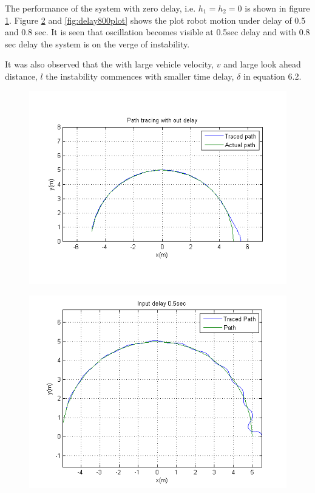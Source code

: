  The  performance of the system with zero delay, i.e. $h_1=h_2=0$ is shown in figure \ref{fig:nodelayplot}. Figure \ref{fig:delay500plot} and \ref{fig:delay800plot} shows the plot robot motion under delay of 0.5 and 0.8 sec.  It is seen that oscillation becomes visible at 0.5sec delay and with 0.8 sec delay the system is on the verge of instability. 
 
 It was also observed that the with large vehicle velocity, $v$ and large look ahead distance, $l$ the instability commences with smaller time delay, $\delta$ in equation 6.2.  
\begin{figure}
	\includegraphics[width=\linewidth,keepaspectratio]{Chapter6/fig/noDelay}
	\label{fig:nodelayplot} 
\end{figure} 
\begin{figure}
	\includegraphics[width=\linewidth,keepaspectratio]{Chapter6/fig/Delay500milsec}
	\label{fig:delay500plot} 
\end{figure} 
